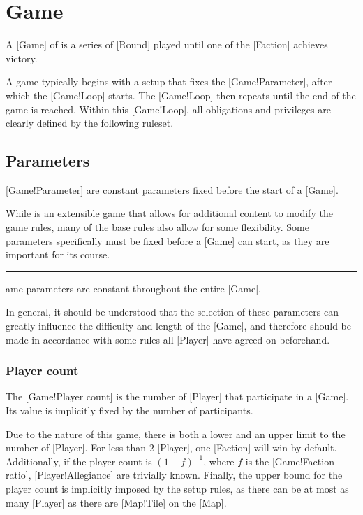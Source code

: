 \chapter{Game}

A [Game] of \DDD{} is a series of [Round] played until one of the [Faction] achieves victory.

A game typically begins with a setup that fixes the [Game!Parameter], after which the [Game!Loop] starts.
The [Game!Loop] then repeats until the end of the game is reached.
Within this [Game!Loop], all obligations and privileges are clearly defined by the following ruleset.

\section{Parameters}

[Game!Parameter] are constant parameters fixed before the start of a [Game].

While \DDD{} is an extensible game that allows for additional content to modify the game rules, many of the base rules also allow for some flexibility.
Some parameters specifically must be fixed before a [Game] can start, as they are important for its course.

\begin{rules}
    \rule{game.parameter.const} Game parameters are constant throughout the entire [Game].
\end{rules}

In general, it should be understood that the selection of these parameters can greatly influence the difficulty and length of the [Game], and therefore should be made in accordance with some rules all [Player] have agreed on beforehand.

\subsection{Player count}

The [Game!Player count] is the number of [Player] that participate in a [Game].
Its value is implicitly fixed by the number of participants.

Due to the nature of this game, there is both a lower and an upper limit to the number of [Player].
For less than \(2\) [Player], one [Faction] will win by default.
Additionally, if the player count is \({(1 - f)}^{-1}\), where \(f\) is the [Game!Faction ratio], [Player!Allegiance] are trivially known.
Finally, the upper bound for the player count is implicitly imposed by the setup rules, as there can be at most as many [Player] as there are [Map!Tile] on the [Map].

